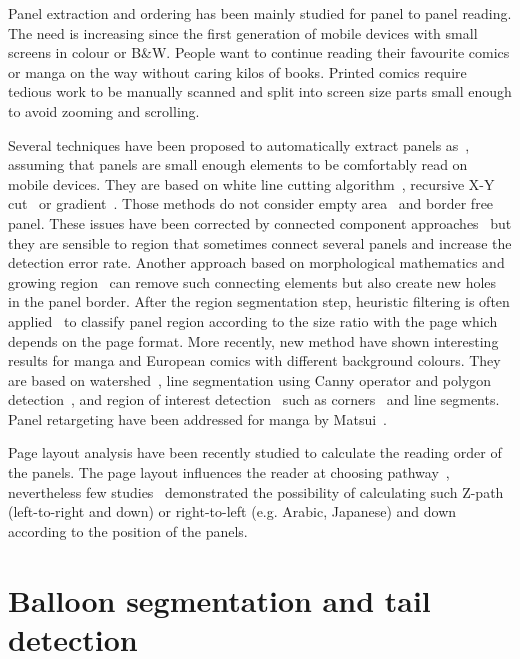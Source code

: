 Panel extraction and ordering has been mainly studied for panel to panel reading.
The need is increasing since the first generation of mobile devices with small screens in colour or B\&W.
People want to continue reading their favourite comics or manga on the way without caring kilos of books.
Printed comics require tedious work to be manually scanned and split into screen size parts small enough to avoid zooming and scrolling.

Several techniques have been proposed to automatically extract panels as~\cite{In11}, assuming that panels are small enough elements to be comfortably read on mobile devices.
They are based on white line cutting algorithm~\cite{Duda72,li2012automatic,Chan2007Automatic}, recursive X-Y cut~\cite{Han07} or gradient~\cite{Tan07}.
Those methods do not consider empty area~\cite{In11} and border free panel.
These issues have been corrected by connected component approaches~\cite{Arai10} 
but they are sensible to region that sometimes connect several panels and increase the detection error rate.
Another approach based on morphological mathematics and growing region~\cite{Khoi11} can remove such connecting elements but also create new holes in the panel border.
After the region segmentation step, heuristic filtering is often applied~\cite{Arai11,Khoi11} to classify panel region according to the size ratio with the page which depends on the page format.
More recently, new method have shown interesting results for manga and European comics with different background colours.
They are based on watershed~\cite{ponsard2012ocr}, line segmentation using Canny operator and polygon detection~\cite{Luyuan2014Automatic}, and region of interest detection~\cite{stommel2012segmentation} such as corners~\cite{Tsai2013Adaptive} and line segments.
Panel retargeting have been addressed for manga by Matsui~\cite{Matsui2011}.

Page layout analysis have been recently studied to calculate the reading order of the panels.
The page layout influences the reader at choosing pathway~\cite{Cohn_2013}, nevertheless few studies~\cite{Guerin2012Ontologies,Ponsard09,Arai2010Automatic} demonstrated the possibility of calculating such Z-path (left-to-right and down) or right-to-left (e.g. Arabic, Japanese) and down~\cite{Li2013Comic,Tsai2013Adaptive} according to the position of the panels. 

\section{Balloon segmentation and tail detection}
\label{sec:sota:balloon_segmentation}

